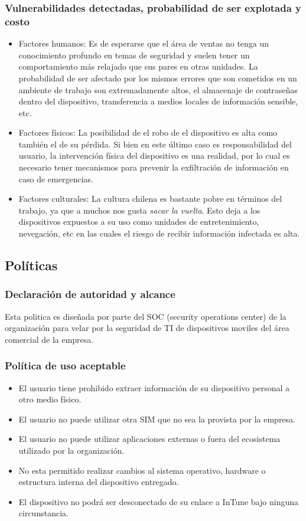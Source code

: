 \documentclass[11pt]{utalcaDoc}
\begin{document}
\subsubsection{ Vulnerabilidades detectadas, probabilidad de ser explotada y costo }
\begin{itemize}
    \item Factores humanos: Es de esperarse que el área de ventas no tenga un conocimiento profundo en temas de seguridad y suelen tener un comportamiento más relajado que sus pares en otras unidades. La probabilidad de ser afectado por los mismos errores que son cometidos en un ambiente de trabajo son extremadamente altos, el almacenaje de contraseñas dentro del dispositivo, transferencia a medios locales de información sensible, etc.
    \item Factores físicos: La posibilidad de el robo de el dispositivo es alta como también el de su pérdida. Si bien en este último caso es responsabilidad del usuario, la intervención física del dispositivo es una realidad, por lo cual es necesario tener mecanismos para prevenir la exfiltración de información en caso de emergencias.
    \item Factores culturales: La cultura chilena es bastante pobre en términos del trabajo, ya que a muchos nos gusta \textit{sacar la vuelta}. Esto deja a los dispositivos expuestos a su uso como unidades de entretenimiento, nevegación, etc en las cuales el riesgo de recibir información infectada es alta.
\end{itemize}

\subsection{Políticas}

\subsubsection{Declaración de autoridad y alcance}
Esta politica es diseñada por parte del SOC (security operations center) de la organización para velar por la seguridad de TI de dispositivos moviles del área comercial de la empresa.

\subsubsection{Política de uso aceptable}
\begin{itemize}
    \item El usuario tiene prohibido extraer información de su dispositivo personal a otro medio físico.
    \item El usuario no puede utilizar otra SIM que no sea la provista por la empresa.
    \item El usuario no puede utilizar aplicaciones externas o fuera del ecosistema utilizado por la organización.
    \item No esta permitido realizar cambios al sistema operativo, hardware o estructura interna del dispositivo entregado.
    \item El dispositivo no podrá ser desconectado de su enlace a InTune bajo ninguna circunstancia.
\end{itemize}
\end{document}
